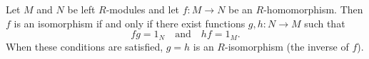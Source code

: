 Let $M$ and $N$ be left $R$-modules and let $f: M \to N$ be an $R$-homomorphism. Then $f$ is an isomorphism if and only if there exist functions $g, h: N \to M$ such that
$$fg = 1_N \quad \text{and} \quad hf = 1_M.$$
When these conditions are satisfied, $g = h$ is an $R$-isomorphism (the inverse of $f$).
